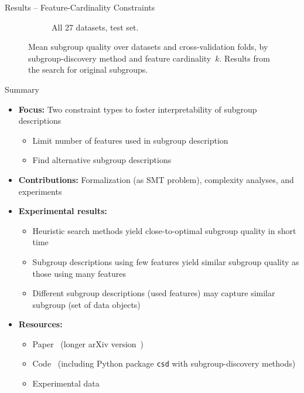 \documentclass[en, navbaroff, handout]{sdqbeamer}
\begin{document}
\begin{frame}[t]{Results -- Feature-Cardinality Constraints}
\begin{figure}
\begin{subfigure}[t]{0.32\textwidth}
			\caption{All 27 datasets, test set.}
			\label{fig:csd:cardinality-test-nwracc-all-datasets}
		\end{subfigure}
		\caption*{
			Mean subgroup quality over datasets and cross-validation folds, by subgroup-discovery method and feature cardinality~$k$.
			Results from the search for original subgroups.
		}
		\label{fig:csd:cardinality}
	\end{figure}
\end{frame}

\begin{frame}[t]{Summary}
	\begin{itemize}
		\item \textbf{Focus:} Two constraint types to foster interpretability of subgroup descriptions
		\begin{itemize}
			\item Limit number of features used in subgroup description
			\item Find alternative subgroup descriptions
		\end{itemize}
		\pause
		\vspace{\baselineskip}
		\item \textbf{Contributions:} Formalization (as SMT problem), complexity analyses, and experiments
		\pause
		\vspace{\baselineskip}
		\item \textbf{Experimental results:}
		\begin{itemize}
			\item Heuristic search methods yield close-to-optimal subgroup quality in short time
			\item Subgroup descriptions using few features yield similar subgroup quality as those using many features
			\item Different subgroup descriptions (used features) may capture similar subgroup (set of data objects)
		\end{itemize}
		\pause
		\vspace{\baselineskip}
		\item \textbf{Resources:}
		\begin{itemize}
			\item Paper~\cite{bach2025subgroup} (longer arXiv version~\cite{bach2025using})
			\item Code~\cite{bach2025constrained} (including Python package \texttt{csd} with subgroup-discovery methods)
			\item Experimental data~\cite{bach2025experimental}
		\end{itemize}
	\end{itemize}
\end{frame}
\end{document}

